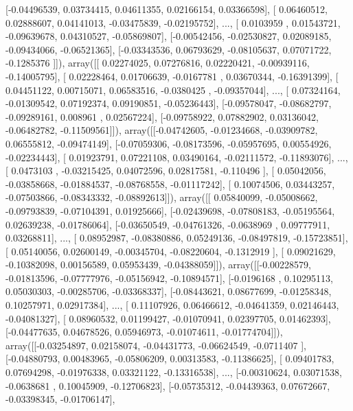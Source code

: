 \documentclass{article}
\begin{document}
       [-0.04496539,  0.03734415,  0.04611355,  0.02166154,  0.03366598],
       [ 0.06460512,  0.02888607,  0.04141013, -0.03475839, -0.02195752],
       ..., 
       [ 0.0103959 ,  0.01543721, -0.09639678,  0.04310527, -0.05869807],
       [-0.00542456, -0.02530827,  0.02089185, -0.09434066, -0.06521365],
       [-0.03343536,  0.06793629, -0.08105637,  0.07071722, -0.1285376 ]]), array([[ 0.02274025,  0.07276816,  0.02220421, -0.00939116, -0.14005795],
       [ 0.02228464,  0.01706639, -0.0167781 ,  0.03670344, -0.16391399],
       [ 0.04451122,  0.00715071,  0.06583516, -0.0380425 , -0.09357044],
       ..., 
       [ 0.07324164, -0.01309542,  0.07192374,  0.09190851, -0.05236443],
       [-0.09578047, -0.08682797, -0.09289161,  0.008961  ,  0.02567224],
       [-0.09758922,  0.07882902,  0.03136042, -0.06482782, -0.11509561]]), array([[-0.04742605, -0.01234668, -0.03909782,  0.06555812, -0.09474149],
       [-0.07059306, -0.08173596, -0.05957695,  0.00554926, -0.02234443],
       [ 0.01923791,  0.07221108,  0.03490164, -0.02111572, -0.11893076],
       ..., 
       [ 0.0473103 , -0.03215425,  0.04072596,  0.02817581, -0.110496  ],
       [ 0.05042056, -0.03858668, -0.01884537, -0.08768558, -0.01117242],
       [ 0.10074506,  0.03443257, -0.07503866, -0.08343332, -0.08892613]]), array([[ 0.05840099, -0.05008662, -0.09793839, -0.07104391,  0.01925666],
       [-0.02439698, -0.07808183, -0.05195564,  0.02639238, -0.01786064],
       [-0.03650549, -0.04761326, -0.0638969 ,  0.09777911,  0.03268811],
       ..., 
       [ 0.08952987, -0.08380886,  0.05249136, -0.08497819, -0.15723851],
       [ 0.05140056,  0.02600149, -0.00345704, -0.08220604, -0.1312919 ],
       [ 0.09021629, -0.10382098,  0.00156589,  0.05953439, -0.04388059]]), array([[-0.00228579, -0.01813596, -0.07777976, -0.05156942, -0.10894571],
       [-0.0196168 ,  0.10295113,  0.05030303, -0.00285706, -0.03368337],
       [-0.08443621,  0.08677699, -0.01258348,  0.10257971,  0.02917384],
       ..., 
       [ 0.11107926,  0.06466612, -0.04641359,  0.02146443, -0.04081327],
       [ 0.08960532,  0.01199427, -0.01070941,  0.02397705,  0.01462393],
       [-0.04477635,  0.04678526,  0.05946973, -0.01074611, -0.01774704]]), array([[-0.03254897,  0.02158074, -0.04431773, -0.06624549, -0.0711407 ],
       [-0.04880793,  0.00483965, -0.05806209,  0.00313583, -0.11386625],
       [ 0.09401783,  0.07694298, -0.01976338,  0.03321122, -0.13316538],
       ..., 
       [-0.00310624,  0.03071538, -0.0638681 ,  0.10045909, -0.12706823],
       [-0.05735312, -0.04439363,  0.07672667, -0.03398345, -0.01706147],
\end{document}
